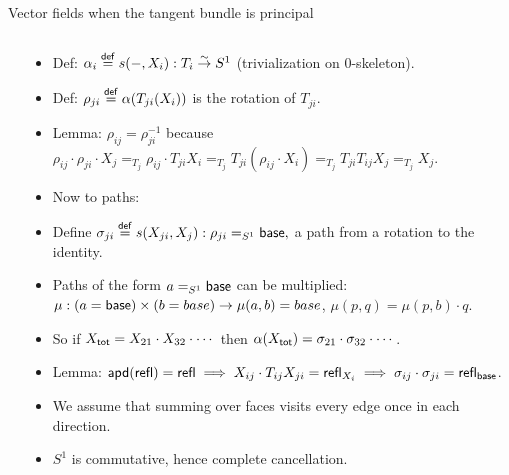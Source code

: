 \begin{frame}{Vector fields when the tangent bundle is principal}
\begin{columns}
\begin{column}{0.2\textwidth}
\end{column}
\begin{column}{0.8\textwidth}
\begin{itemize}
\item Def: \( \alpha_i\stackrel{\mathsf{def}}{=} s(-,X_i):T_i\stackrel{\sim}{\to} S^1 \) (\alert{trivialization on 0-skeleton}).
\item Def: \( \rho_{ji}\stackrel{\mathsf{def}}{=} \alpha(T_{ji}(X_i)) \) is \alert{the rotation of \( T_{ji} \)}.
\item Lemma: \( \rho_{ij}=\rho_{ji}^{-1} \) because \( \rho_{ij}\cdot\rho_{ji}\cdot X_j=_{T_j}\rho_{ij}\cdot T_{ji}X_i=_{T_j}T_{ji}(\rho_{ij}\cdot X_i)=_{T_j}T_{ji} T_{ij} X_j=_{T_j}X_j \).
\item Now to paths:
\item Define \( \sigma_{ji}\stackrel{\mathsf{def}}{=} s(X_{ji}, X_j):\rho_{ji}=_{S^1}\mathsf{base}, \) a path from a rotation to the identity.
\item Paths of the form \( a=_{S^1}\mathsf{base} \) can be multiplied: \( \mu:(a=\mathsf{base})\times (b=base)\to \mu(a, b)=base \), \( \mu(p, q)=\mu(p, b)\cdot q. \)
\item So if \( X_{\mathsf{tot}} = X_{21}\cdot X_{32}\cdot\cdots \) then \( \alpha(X_{\mathsf{tot}})=\sigma_{21}\cdot\sigma_{32}\cdot\cdots \).
\item Lemma: \( \mathsf{apd}(\mathsf{refl})=\mathsf{refl}\implies X_{ij}\cdot T_{ij}X_{ji}=\mathsf{refl}_{X_i}\implies\sigma_{ij}\cdot\sigma_{ji}=\mathsf{refl}_{\mathsf{base}} \).
\item We assume that summing over faces visits every edge once in each direction.
\item \( S^1 \) is commutative, hence complete cancellation.
\end{itemize}
\end{column}
\end{columns}
\end{frame}



